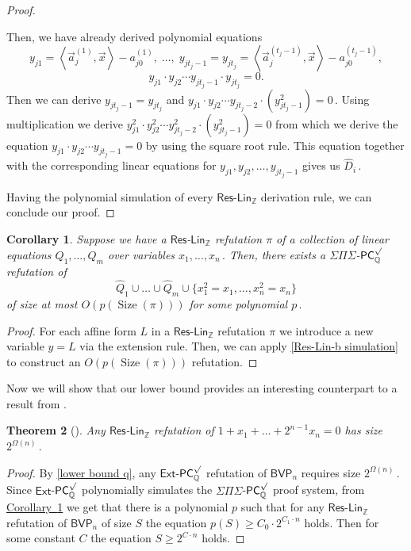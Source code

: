 \documentclass[11pt]{article}
\newcommand{\expref}[2]{\texorpdfstring{\hyperref[#2]{#1~\ref{#2}}}{#1~\ref{#2}}}
\newtheorem{theorem}{Theorem}[section]
\newtheorem{corollary}[theorem]{Corollary}
\newcommand{\Q}{{\mathbb Q}}
\newcommand{\Z}{{\mathbb Z}}
\DeclareMathOperator{\Size}{\mathrm{Size}}
\begin{document}
\begin{proof}
\begin{itemize}
    Then, we have already derived polynomial equations 
    $$
    y_{j 1} = \left\langle \vec a_j^{(1)}, \vec x \right \rangle - a_{j 0}^{(1)}, \; \ldots, \; y_{j t_{j} - 1} = y_{j t_j} = \left\langle \vec a_j^{(t_{j} - 1)}, \vec x \right \rangle - a_{j 0}^{(t_j - 1)},
    $$
    $$
    y_{j 1} \cdot y_{j 2} \cdots y_{j t_j - 1} \cdot y_{j t_j} = 0.
    $$
    Then we can derive $y_{j t_j - 1} = y_{j t_j}$ and %
$y_{j 1} \cdot y_{j 2} \cdots y_{j t_j - 2} \cdot (y_{j t_j - 1}^2) = 0\,.$ %
 Using multiplication we derive  $y_{j 1}^2 \cdot y_{j 2}^2 \cdots y_{j t_j - 2}^2 \cdot (y_{j t_j - 1}^2) = 0$ from which we derive the equation $y_{j 1} \cdot y_{j 2} \cdots y_{j t_j - 1} = 0$ by using the square root rule. This equation together with the corresponding linear equations for  $y_{j 1}, y_{j 2}, \ldots, y_{j t_j - 1}$ gives us %
$\widehat{D}_i\,.$ %
\end{itemize}
Having the polynomial simulation of every $\mathsf{Res}$-$\mathsf{Lin}_\Z$ derivation rule, we can conclude our proof.\end{proof}


\begin{corollary}\label{cor:SPS-PC sim of res-lin}
Suppose we have a  $\mathsf{Res}$-$\mathsf{Lin}_\Z$ refutation $\pi$ of a collection of linear equations $Q_1, \ldots, Q_m$ over variables %
$x_1, \ldots, x_n\,.$ %
  Then, there exists a $\Sigma \Pi \Sigma$-$\mathsf{PC}_\Q^{\surd}$ refutation of
$$
\widehat{Q}_1 \cup \ldots \cup \widehat{Q}_m  \cup \{x_1^2 = x_1, \ldots, x_n^2 = x_n\}
$$ 
of size at most $O(p(\Size(\pi)))$ for some polynomial %
$p\,.$ %
\end{corollary}
\begin{proof}
%
For each affine form $L$ in a $\mathsf{Res}$-$\mathsf{Lin}_\Z$ refutation $\pi$ we introduce a new variable $y = L$ via the extension rule. Then, we can apply  \autoref{Res-Lin-b simulation} to construct an $O(p(\Size(\pi)))$ refutation. %
\end{proof}

Now we will show that our lower bound provides an interesting counterpart to a result from  \cite{PT18_new}.

\begin{theorem}[\cite{PT18_new}]\label{Res-Lin lower bound}
%
Any $\mathsf{Res}$-$\mathsf{Lin}_\Z$ refutation of $1 + x_1 + \ldots + 2^{n - 1} x_n = 0$ has size %
$2^{\Omega(n)}\,.$ %
%
\end{theorem}

\begin{proof}
%
By \autoref{lower bound q}, any $\mathsf{Ext}$-$\mathsf{PC}_{\Q}^{\surd}$ refutation of $\mathsf{BVP}_n$  requires size %
$2^{\Omega(n)}\,.$ %
 Since $\mathsf{Ext}$-$\mathsf{PC}_{\Q}^{\surd}$ polynomially simulates the $\Sigma \Pi \Sigma$-$\mathsf{PC}_\Q^{\surd}$ proof system, from \expref{Corollary}{cor:SPS-PC sim of res-lin} we get that there is a polynomial $p$ such that for any  $\mathsf{Res}$-$\mathsf{Lin}_\Z$ refutation of $\mathsf{BVP}_n$ of size $S$ the equation $p(S) \ge C_0 \cdot 2^{C_1 \cdot n}$ holds. Then for some constant $C$ the equation $S \ge 2^{C \cdot n}$ holds. \end{proof} %
\end{document}
